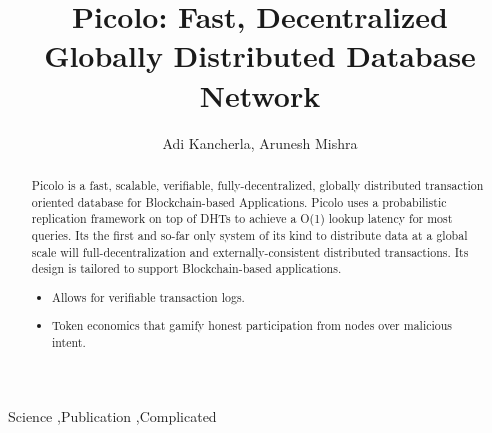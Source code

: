 \documentclass[preprint,12pt]{elsarticle}
\begin{document}
\begin{frontmatter}


\title{Picolo: Fast, Decentralized Globally Distributed Database Network}

\author{Adi Kancherla, Arunesh Mishra}
\address{San Francisco, California}




\begin{abstract}
Picolo is a fast, scalable, verifiable, fully-decentralized, globally distributed transaction oriented database for
Blockchain-based Applications. Picolo uses a probabilistic replication framework on top of DHTs to achieve a O(1)
lookup latency for most queries. Its the first and so-far only system of its kind to distribute data at a global
scale will full-decentralization and externally-consistent distributed transactions. Its design is tailored to
support Blockchain-based applications.

\begin{itemize}
    \item Allows for verifiable transaction logs.
    \item Token economics that gamify honest participation from nodes over malicious intent.
\end{itemize}
\end{abstract}

\begin{keyword}
Science \sep Publication \sep Complicated


\end{keyword}

\end{frontmatter}
\end{document}
